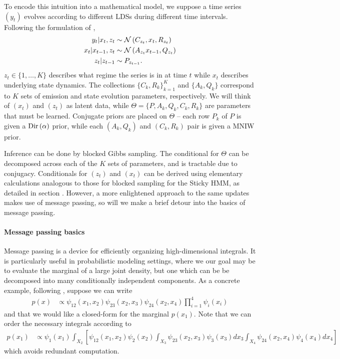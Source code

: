 \documentclass[14pt]{extreport}
\begin{document}
To encode this intuition into a mathematical model, we suppose a time series
$\left(y_{t}\right)$ evolves according to different LDSs during different time
intervals. Following the formulation of \citep{linderman2016recurrent},
\begin{align*}
  y_{t} \vert  x_t, z_t &\sim \mathcal{N}\left(C_{z_t}, x_t, R_{z_t}\right) \\
  x_{t} \vert x_{t - 1}, z_{t} &\sim \mathcal{N}\left(A_{z_t}x_{t - 1}, Q_{z_t}\right) \\
  z_t \vert z_{t - 1} &\sim P_{z_{t - 1}}.
\end{align*}
$z_t \in \{1, \dots, K\}$ describes what regime the series is in at time $t$
while $x_t$ describes underlying state dynamics. The collections $\{C_k,
R_k\}_{k = 1}^{K}$ and $\{A_k, Q_k\}$ correspond to $K$ sets of emission and
state evolution parameters, respectively. We will think of $\left(x_t\right)$
and $\left(z_t\right)$ as latent data, while $\Theta = \{P, A_k, Q_k, C_k, R_k\}$
are parameters that must be learned. Conjugate priors are placed on $\Theta$ --
each row $P_k$ of $P$ is given a $\textnormal{Dir}\left(\alpha\right)$ prior, while each
$\left(A_k, Q_k\right)$ and $\left(C_k, R_k\right)$ pair is given a MNIW prior.

Inference can be done by blocked Gibbs sampling. The conditional for $\Theta$
can be decomposed across each of the $K$ sets of parameters, and is tractable
due to conjugacy. Conditionals for $\left(z_t\right)$ and $\left(x_t\right)$ can
be derived using elementary calculations analogous to those for blocked sampling
for the Sticky HMM, as detailed in section \label{sec:sticky_hmms}. However, a
more enlightened approach to the same updates makes use of message passing, so
will we make a brief detour into the basics of message passing.

\paragraph{Message passing basics}
\label{paragraph:message_passing}

Message passing is a device for efficiently organizing high-dimensional
integrals. It is particularly useful in probabilistic modeling settings, where
we our goal may be to evaluate the marginal of a large joint density, but one
which can be be decomposed into many conditionally independent components. As a
concrete example, following \citep{fox2009bayesian}, suppose we can write
\begin{align*}
p\left(x\right) &\propto \psi_{12}\left(x_1, x_2\right)\psi_{23}\left(x_2, x_3\right)\psi_{24}\left(x_2, x_4\right) \prod_{i = 1}^{4}\psi_{i}\left(x_i\right)
\end{align*}
and that we would like a closed-form for the marginal $p\left(x_1\right)$. Note
that we can order the necessary integrals according to
\begin{align*}
  p\left(x_1\right) &\propto \psi_1\left(x_1\right)
  \int_{X_2}\left[\psi_{12}\left(x_1, x_2\right)\psi_2\left(x_2\right)
    \int_{X_3} \psi_{23}\left(x_2, x_3\right) \psi_3\left(x_3\right) dx_3
    \int_{X_4} \psi_{24}\left(x_2, x_4\right)\psi_4\left(x_4\right) dx_4
    \right]
\end{align*}
which avoids redundant computation.
\end{document}
